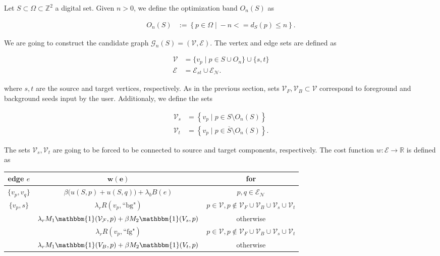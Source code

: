 Let $S \subset \Omega \subset \mathbb{Z}^2$ a digital set. Given $n>0$, we define the optimization band $O_n(S)$ as

\begin{align*}
	O_n(S) &:=\left\{ p \in \Omega \; | \; -n <= d_{S}(p) \leq n \right\}.
\end{align*}

We are going to construct the candidate graph $\mathcal{G}_n(S) = ( \mathcal{V},\mathcal{E})$. The vertex and edge sets are defined as 

\begin{align*}
	\mathcal{V} &= \{ v_p \; | \; p \in S \cup O_n \} \cup \{s,t\} \\
	\mathcal{E} &= \mathcal{E}_{st} \cup \mathcal{E}_\mathcal{N}.
\end{align*}

where $s,t$ are the source and target vertices, respectively. As in the previous section, sets $\mathcal{V}_F,\mathcal{V}_B \subset \mathcal{V}$ correspond to foreground and background seeds input by the user. Additionaly, we define the sets

\begin{align*}
	\mathcal{V}_s &= \left\{ v_p \; | \; p \in S \setminus O_n(S) \right\}\\
	\mathcal{V}_t &= \left\{ v_p \; | \; p \in \overline{S} \setminus O_n(S) \right\}.
\end{align*}

The sets $\mathcal{V}_s, \mathcal{V}_t$ are going to be forced to be connected to source and target components, respectively. The cost function $w:\mathcal{E}\rightarrow \mathbb{R}$ is defined as 

\begin{table}[H]
\centering
\setlength{\extrarowheight}{0.75em}
\begin{tabular}{|c|c|c|}
\hline
\textbf{edge} $e$ & $\mathbf{w(e)}$ & \textbf{for}\\
\hline
$\{v_p, v_q\}$ & $\beta \big(u(S,p) + u(S,q)\big) + \lambda_bB(e)$ & $p,q \in \mathcal{E}_{\mathcal{N}}$\\
\hline
\multirow{3}{*}{$\{v_p, s\}$} & $\lambda_r R(v_p,\text{``bg"})$ & $p \in \mathcal{\mathcal{V}}, p \notin \mathcal{\mathcal{V}}_F \cup \mathcal{\mathcal{V}}_B \cup \mathcal{\mathcal{V}}_s \cup \mathcal{\mathcal{V}}_t$\\
& $\lambda_r M_1\mathbbm{1}(\mathcal{V_F},p) + \beta M_2\mathbbm{1}(V_s,p)$ & otherwise \\
\hline
\multirow{3}{*}{$\{v_p, t\}$} & $\lambda_r R(v_p,\text{``fg"})$ & $p \in \mathcal{\mathcal{V}}, p \notin \mathcal{\mathcal{V}}_F \cup \mathcal{\mathcal{V}}_B \cup \mathcal{\mathcal{V}}_s \cup \mathcal{\mathcal{V}}_t$ \\
& $\lambda_r M_1\mathbbm{1}(V_B,p) + \beta M_2\mathbbm{1}(V_t,p)$ & otherwise \\
\hline
\end{tabular}
\end{table}


